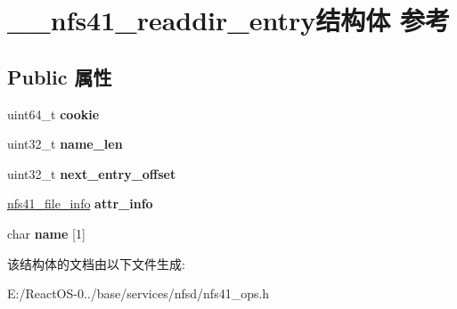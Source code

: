 \hypertarget{struct____nfs41__readdir__entry}{}\section{\+\_\+\+\_\+nfs41\+\_\+readdir\+\_\+entry结构体 参考}
\label{struct____nfs41__readdir__entry}
\subsection*{Public 属性}
\begin{DoxyCompactItemize}
\item 
\mbox{\label{struct____nfs41__readdir__entry_adf3e2225466ad7ec21ddd2d28b4dac4e}} 
uint64\+\_\+t {\bfseries cookie}
\item 
\mbox{\label{struct____nfs41__readdir__entry_a30ba0b7112d4efe7a08553043960fa22}} 
uint32\+\_\+t {\bfseries name\+\_\+len}
\item 
\mbox{\label{struct____nfs41__readdir__entry_a8ef364795564b067e48fd4d61a056060}} 
uint32\+\_\+t {\bfseries next\+\_\+entry\+\_\+offset}
\item 
\mbox{\label{struct____nfs41__readdir__entry_aa86017e273bcf50ce695175ac47cbccc}} 
\hyperlink{struct____nfs41__file__info}{nfs41\+\_\+file\+\_\+info} {\bfseries attr\+\_\+info}
\item 
\mbox{\label{struct____nfs41__readdir__entry_a724899017afee04ff87dd08ea27c07f1}} 
char {\bfseries name} \mbox{[}1\mbox{]}
\end{DoxyCompactItemize}


该结构体的文档由以下文件生成\+:\begin{DoxyCompactItemize}
\item 
E\+:/\+React\+O\+S-\/0../base/services/nfsd/nfs41\+\_\+ops.\+h\end{DoxyCompactItemize}
